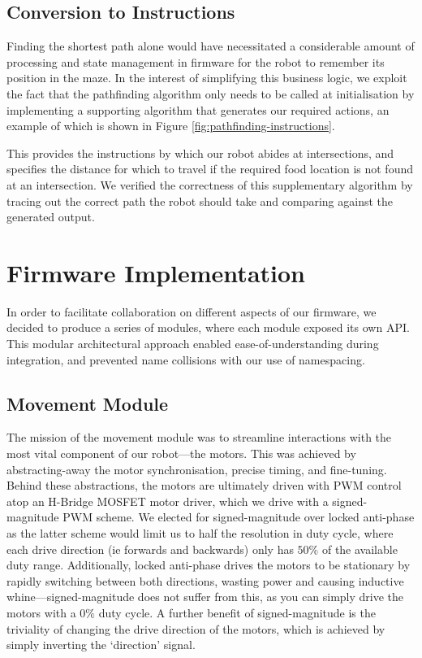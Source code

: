\documentclass[conference]{IEEEtran}
\begin{document}
\subsection{Conversion to Instructions}

Finding the shortest path alone would have necessitated a considerable amount of processing and state management in firmware for the robot to remember its position in the maze.
In the interest of simplifying this business logic, we exploit the fact that the pathfinding algorithm only needs to be called at initialisation by implementing a supporting algorithm that generates our required actions, an example of which is shown in Figure \ref{fig:pathfinding-instructions}.

This provides the instructions by which our robot abides at intersections, and specifies the distance for which to travel if the required food location is not found at an intersection.
We verified the correctness of this supplementary algorithm by tracing out the correct path the robot should take and comparing against the generated output.



\section{Firmware Implementation}

In order to facilitate collaboration on different aspects of our firmware, we decided to produce a series of modules, where each module exposed its own API.
This modular architectural approach enabled ease-of-understanding during integration, and prevented name collisions with our use of namespacing.


\subsection{Movement Module}

The mission of the movement module was to streamline interactions with the most vital component of our robot—the motors.
This was achieved by abstracting-away the motor synchronisation, precise timing, and fine-tuning.
Behind these abstractions, the motors are ultimately driven with PWM control atop an H-Bridge MOSFET motor driver, which we drive with a signed-magnitude PWM scheme.
We elected for signed-magnitude over locked anti-phase as the latter scheme would limit us to half the resolution in duty cycle, where each drive direction (ie forwards and backwards) only has $50\%$ of the available duty range.
Additionally, locked anti-phase drives the motors to be stationary by rapidly switching between both directions, wasting power and causing inductive whine—signed-magnitude does not suffer from this, as you can simply drive the motors with a $0\%$ duty cycle.
A further benefit of signed-magnitude is the triviality of changing the drive direction of the motors, which is achieved by simply inverting the `direction' signal.
\end{document}
